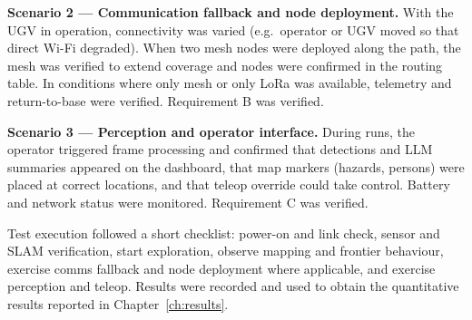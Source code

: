 \textbf{Scenario 2 --- Communication fallback and node deployment.} With the UGV in operation, connectivity was varied (e.g.\ operator or UGV moved so that direct Wi-Fi degraded). When two mesh nodes were deployed along the path, the mesh was verified to extend coverage and nodes were confirmed in the routing table. In conditions where only mesh or only LoRa was available, telemetry and return-to-base were verified. Requirement B was verified.

\textbf{Scenario 3 --- Perception and operator interface.} During runs, the operator triggered frame processing and confirmed that detections and LLM summaries appeared on the dashboard, that map markers (hazards, persons) were placed at correct locations, and that teleop override could take control. Battery and network status were monitored. Requirement C was verified.

Test execution followed a short checklist: power-on and link check, sensor and SLAM verification, start exploration, observe mapping and frontier behaviour, exercise comms fallback and node deployment where applicable, and exercise perception and teleop. Results were recorded and used to obtain the quantitative results reported in Chapter~\ref{ch:results}.
